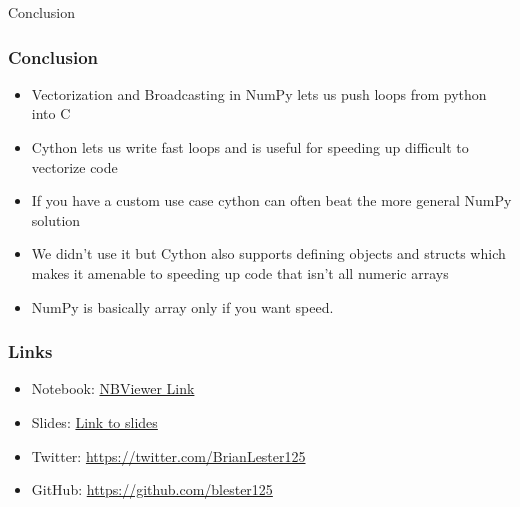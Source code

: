 \documentclass{beamer}
\theoremstyle{case}
\begin{document}
\begin{section}{Conclusion}

\begin{frame}
    \frametitle{Conclusion}
    \begin{itemize}
        \item Vectorization and Broadcasting in NumPy lets us push loops from python into C
        \item Cython lets us write fast loops and is useful for speeding up difficult to vectorize code
        \item If you have a custom use case cython can often beat the more general NumPy solution
    \end{itemize}
    \begin{itemize}
        \item We didn't use it but Cython also supports defining objects and structs which makes it amenable to speeding up code that isn't all numeric arrays
        \item NumPy is basically array only if you want speed.
    \end{itemize}
\end{frame}

\begin{frame}
    \frametitle{Links}
    \begin{itemize}
        \item Notebook: \href{https://www.google.com}{NBViewer Link}
        \item Slides: \href{https://www.google.com}{Link to slides}
        \item Twitter: \href{https://twitter.com/BrianLester125}{https://twitter.com/BrianLester125}
        \item GitHub: \href{https://github.com/blester125}{https://github.com/blester125}
    \end{itemize}
\end{frame}

\end{section} %
\end{document}
